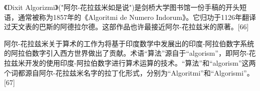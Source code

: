 《Dixit Algorizmi》("阿尔-花拉兹米如是说")是剑桥大学图书馆一份手稿的开头短语，通常被称为1857年的《Algoritmi de Numero Indorum》。它归功于1126年翻译过天文表的巴斯的阿德拉尔德。这部作品也许最接近阿尔-花拉兹米的原著。[66]

阿尔-花拉兹米关于算术的工作为将基于印度数学中发展出的印度-阿拉伯数字系统的阿拉伯数字引入西方世界做出了贡献。术语“算法”源自于“algorism”，即阿尔-花拉兹米开发的使用印度-阿拉伯数字进行算术运算的技术。“算法”和“algorism”这两个词都源自阿尔-花拉兹米名字的拉丁化形式，分别为“Algoritmi”和“Algorismi”。[67]